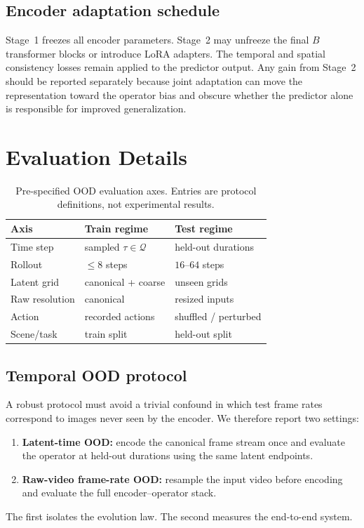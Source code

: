 \documentclass{article}
\theoremstyle{plain}
\theoremstyle{definition}
\theoremstyle{remark}
\begin{document}
\subsection{Encoder adaptation schedule}
Stage~1 freezes all encoder parameters. Stage~2 may unfreeze the final $B$ transformer blocks or introduce LoRA adapters. The temporal and spatial consistency losses remain applied to the predictor output. Any gain from Stage~2 should be reported separately because joint adaptation can move the representation toward the operator bias and obscure whether the predictor alone is responsible for improved generalization.

\section{Evaluation Details}
\label{app:evaluation}

\begin{table}[H]
\caption{Pre-specified OOD evaluation axes. Entries are protocol definitions, not experimental results.}
\label{tab:ood_protocol}
\centering
\small
\begin{tabular}{lll}
\toprule
Axis & Train regime & Test regime \\
\midrule
Time step & sampled $\tau\in\mathcal{Q}$ & held-out durations \\
Rollout & $\le 8$ steps & $16$--$64$ steps \\
Latent grid & canonical + coarse & unseen grids \\
Raw resolution & canonical & resized inputs \\
Action & recorded actions & shuffled / perturbed \\
Scene/task & train split & held-out split \\
\bottomrule
\end{tabular}
\end{table}

\subsection{Temporal OOD protocol}
A robust protocol must avoid a trivial confound in which test frame rates correspond to images never seen by the encoder. We therefore report two settings:
\begin{enumerate}
    \item \textbf{Latent-time OOD:} encode the canonical frame stream once and evaluate the operator at held-out durations using the same latent endpoints.
    \item \textbf{Raw-video frame-rate OOD:} resample the input video before encoding and evaluate the full encoder--operator stack.
\end{enumerate}
The first isolates the evolution law. The second measures the end-to-end system.
\end{document}
